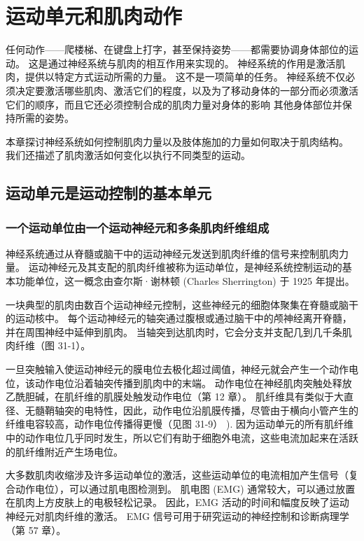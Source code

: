 \chapter{运动单元和肌肉动作} \label{chap:chap31}

任何动作——爬楼梯、在键盘上打字，甚至保持姿势——都需要协调身体部位的运动。 这是通过神经系统与肌肉的相互作用来实现的。 神经系统的作用是激活肌肉，提供以特定方式运动所需的力量。 这不是一项简单的任务。 神经系统不仅必须决定要激活哪些肌肉、激活它们的程度，以及为了移动身体的一部分而必须激活它们的顺序，而且它还必须控制合成的肌肉力量对身体的影响 其他身体部位并保持所需的姿势。

本章探讨神经系统如何控制肌肉力量以及肢体施加的力量如何取决于肌肉结构。 我们还描述了肌肉激活如何变化以执行不同类型的运动。

\section{运动单元是运动控制的基本单元}
\subsection{一个运动单位由一个运动神经元和多条肌肉纤维组成}
神经系统通过从脊髓或脑干中的运动神经元发送到肌肉纤维的信号来控制肌肉力量。 运动神经元及其支配的肌肉纤维被称为运动单位，是神经系统控制运动的基本功能单位，这一概念由查尔斯·谢林顿 (Charles Sherrington) 于 1925 年提出。

一块典型的肌肉由数百个运动神经元控制，这些神经元的细胞体聚集在脊髓或脑干的运动核中。 每个运动神经元的轴突通过腹根或通过脑干中的颅神经离开脊髓，并在周围神经中延伸到肌肉。 当轴突到达肌肉时，它会分支并支配几到几千条肌肉纤维（图 31-1）。

一旦突触输入使运动神经元的膜电位去极化超过阈值，神经元就会产生一个动作电位，该动作电位沿着轴突传播到肌肉中的末端。 动作电位在神经肌肉突触处释放乙酰胆碱，在肌纤维的肌膜处触发动作电位（第 12 章）。 肌纤维具有类似于大直径、无髓鞘轴突的电特性，因此，动作电位沿肌膜传播，尽管由于横向小管产生的纤维电容较高，动作电位传播得更慢（见图 31-9） ). 因为运动单元的所有肌纤维中的动作电位几乎同时发生，所以它们有助于细胞外电流，这些电流加起来在活跃的肌纤维附近产生场电位。

大多数肌肉收缩涉及许多运动单位的激活，这些运动单位的电流相加产生信号（复合动作电位），可以通过肌电图检测到。 肌电图 (EMG) 通常较大，可以通过放置在肌肉上方皮肤上的电极轻松记录。 因此，EMG 活动的时间和幅度反映了运动神经元对肌肉纤维的激活。 EMG 信号可用于研究运动的神经控制和诊断病理学（第 57 章）。

